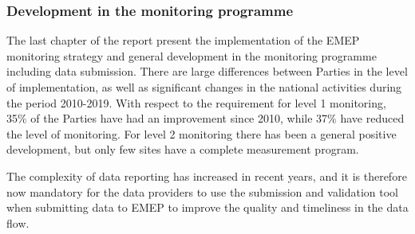 \subsubsection*{Development in the monitoring programme} %
The last chapter of the report present the implementation of the EMEP monitoring strategy and general development in the monitoring programme including data submission. There are large differences between Parties in the level of implementation, as well as significant changes in the national activities during the period 2010-2019. With respect to the requirement for level 1 monitoring, 35\% of the Parties have had an improvement since 2010, while 37\% have reduced the level of monitoring. For level 2 monitoring there has been a general positive development, but only few sites have a complete measurement program.

The complexity of data reporting has increased in recent years, and it is therefore now mandatory for the data providers to use the submission and validation tool when submitting data to EMEP to improve the quality and timeliness in the data flow.


